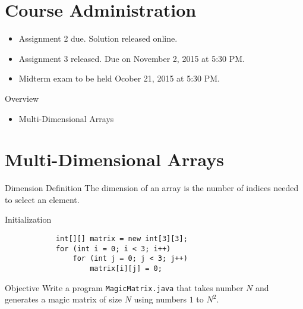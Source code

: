 \documentclass[10pt, compress]{beamer}
\begin{document}
\prepareCover

\section{Course Administration}

\begin{slide}
	\begin{itemize}
		\item[] Assignment 2 due. Solution released online.
		\item[] Assignment 3 released. Due on November 2, 2015 at 5:30 PM.
		\item[] Midterm exam to be held Ocober 21, 2015 at 5:30 PM.
	\end{itemize}
\end{slide}

\begin{slide}
	\begin{block}{Overview}
		\begin{itemize}
			\item[] Multi-Dimensional Arrays
		\end{itemize}
	\end{block}
\end{slide}

\section{Multi-Dimensional Arrays}

\begin{slide}
	\begin{block}{Dimension Definition}
		The dimension of an array is the number of indices needed to select an element.
	\end{block}
	\begin{block}{Initialization}
		\begin{verbatim}
			int[][] matrix = new int[3][3];
			for (int i = 0; i < 3; i++)
			    for (int j = 0; j < 3; j++)
			        matrix[i][j] = 0;
		\end{verbatim}
	\end{block}
\end{slide}

\begin{slide}
	\begin{block}{Objective}
		Write a program \texttt{MagicMatrix.java} that takes number $N$ and generates a magic matrix of size $N$ using numbers $1$ to $N^2$.
	\end{block}
\end{slide}
\end{document}
